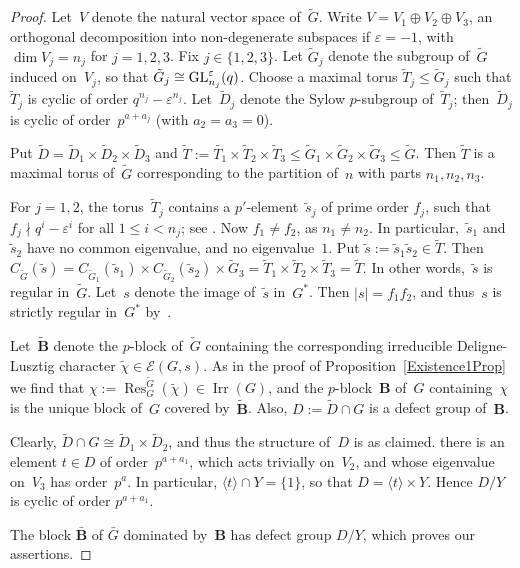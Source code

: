 \documentclass[12pt]{amsart}
\newcommand{\bB}{{\mathbf{B}}}
\def\GL{ \text{\rm GL} }
\DeclareMathOperator{\Res}{Res}               %
\DeclareMathOperator{\Irr}{Irr}
\theoremstyle{theorem}
\theoremstyle{definition}
\theoremstyle{remark}
\begin{document}
\begin{proof}
Let~$V$ denote the natural vector space of~$\tilde{G}$. Write
$V = V_1 \oplus V_2 \oplus V_3$, an orthogonal decomposition into non-degenerate
subspaces if $\varepsilon = -1$, with $\dim V_j = n_j$ for $j = 1, 2, 3$. Fix 
$j \in \{ 1, 2, 3 \}$. Let $\tilde{G}_j$ denote the subgroup of~$\tilde{G}$
induced on~$V_j$, so that $\tilde{G}_j \cong \GL_{n_j}^\varepsilon( q )$. Choose 
a maximal torus $\tilde{T}_{j} \leq \tilde{G}_j$ such that $\tilde{T}_{j}$ is 
cyclic of order $q^{n_j} - \varepsilon^{n_j}$. Let~$\tilde{D}_{j}$ denote the 
Sylow $p$-subgroup of~$\tilde{T}_{j}$; then~$\tilde{D}_j$ is cyclic of 
order~$p^{a+a_j}$ (with $a_2 = a_3 = 0$).

Put $\tilde{D} = \tilde{D}_{1} \times \tilde{D}_{2} \times \tilde{D}_3$ and
$\tilde{T} := \tilde{T_1} \times \tilde{T}_2  \times \tilde{T}_3 \leq 
\tilde{G}_1 \times \tilde{G}_2  \times \tilde{G}_3 \leq \tilde{G}$. Then 
$\tilde{T}$ is a maximal torus of~$\tilde{G}$ corresponding to the partition 
of~$n$ with parts $n_1, n_2, n_3$.

For $j = 1, 2$, the
torus~$\tilde{T}_j$ contains a $p'$-element~$\tilde{s}_j$ of prime order $f_j$,
such that $f_j \nmid q^i - \varepsilon^i$ for all $1 \leq i < n_j$; see
\cite[Lemma~$3.6.3$]{HL25}.
Now $f_1 \neq f_2$, as $n_1 \neq n_2$.
In particular,~$\tilde{s}_1$ and~$\tilde{s}_2$ have no common eigenvalue, and no 
eigenvalue~$1$. Put $\tilde{s} := \tilde{s}_1\tilde{s}_2 \in \tilde{T}$. 
Then $C_{\tilde{G}}( \tilde{s} ) = 
C_{\tilde{G}_1}( \tilde{s}_1 ) \times C_{\tilde{G}_2}( \tilde{s}_2 ) \times
\tilde{G}_3 = \tilde{T}_1 \times \tilde{T}_2 \times \tilde{T}_3 = \tilde{T}$. In 
other words,~$\tilde{s}$ is regular in~$\tilde{G}$. Let~$s$ denote the image 
of~$\tilde{s}$ in~$G^*$. Then $|s| = f_1f_2$, and thus~$s$ is strictly regular 
in~$G^*$ by~\cite[$2.5.1$]{HL25}.

Let~$\tilde{\bB}$ denote the $p$-block of~$\tilde{G}$ containing the 
corresponding irreducible Deligne-Lusztig character 
$\tilde{\chi} \in \mathcal{E}(G,s)$. As in the proof of 
Proposition~\ref{Existence1Prop} we find that
$\chi := \Res^{\tilde{G}}_G( \tilde{\chi} ) \in \Irr( G )$, and
the $p$-block~$\bB$ of~$G$ containing~$\chi$ is the unique block of~$G$
covered by~$\tilde{\bB}$. Also, $D := \tilde{D} \cap G$ is a defect group
of~$\bB$.

Clearly, $\tilde{D} \cap G \cong \tilde{D}_1 \times \tilde{D}_2$, and thus
the structure of~$D$ is as claimed. there is an element $t \in D$ of 
order~$p^{a+a_1}$, which acts trivially on~$V_2$, and whose eigenvalue on~$V_3$ 
has order~$p^a$. In particular, $\langle t \rangle \cap Y = \{ 1 \}$, so that 
$D = \langle t \rangle \times Y$. Hence $D/Y$ is cyclic of order $p^{a+a_1}$.

The block $\bar{\bB}$ of $\bar{G}$ dominated by~$\bB$ has defect group $D/Y$, 
which proves our assertions.
\end{proof}
\end{document}
